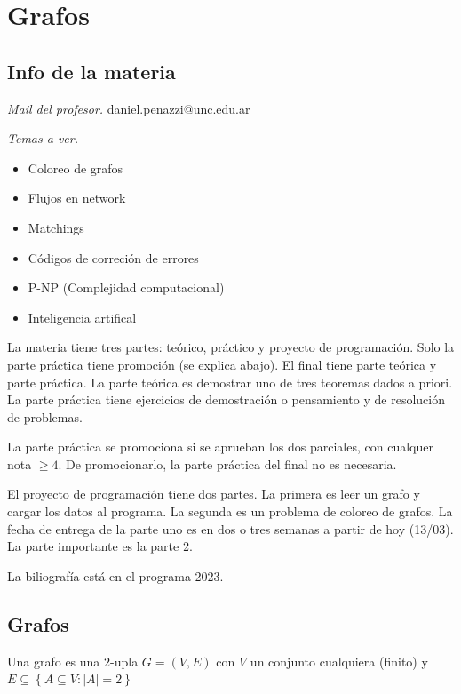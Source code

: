 \documentclass[a4paper]{article}
\begin{document}
\section{Grafos}

\subsection{Info de la materia}

\textit{Mail del profesor.} daniel.penazzi@unc.edu.ar

\textit{Temas a ver.}

\begin{itemize}
    \item Coloreo de grafos 
    \item Flujos en network 
    \item Matchings 
    \item Códigos de correción de errores
    \item P-NP (Complejidad computacional)
    \item Inteligencia artifical
\end{itemize}

La materia tiene tres partes: teórico, práctico y proyecto de programación. Solo
la parte práctica tiene promoción (se explica abajo). El final tiene parte
teórica y parte práctica. La parte teórica es demostrar uno de tres teoremas
dados a priori. La parte práctica tiene ejercicios de demostración o pensamiento
y de resolución de problemas.

La parte práctica se promociona si se aprueban los dos parciales, con cualquer
nota $\geq 4$. De promocionarlo, la parte práctica del final no es necesaria.

El proyecto de programación tiene dos partes. La primera es leer un grafo y
cargar los datos al programa. La segunda es un problema de coloreo de grafos. La
fecha de entrega de la parte uno es en dos o tres semanas a partir de hoy
(13/03). La parte importante es la parte 2.

La biliografía está en el programa 2023.

\subsection{Grafos}

\begin{definition}
    Una grafo es una $2$-upla $G = (V, E)$ con $V$ un conjunto cualquiera (finito) y $E
    \subseteq \left\{ A \subseteq V : |A| = 2 \right\} $
\end{definition}
\end{document}
